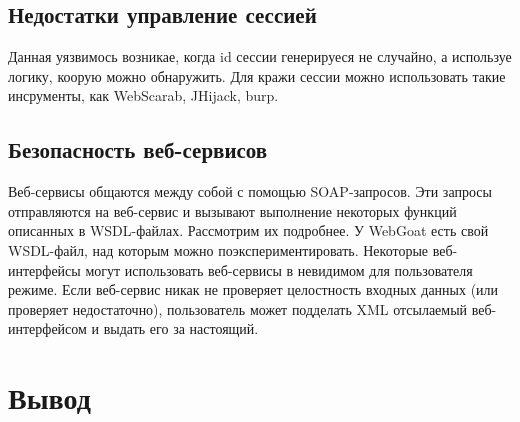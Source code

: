 \documentclass[11pt, a4paper]{article}		%
\begin{document}

\subsection{Недостатки управление сессией}

Данная уязвимось возникае, когда id сессии генерируеся не случайно, а используе логику, коорую можно обнаружить. Для кражи сессии можно использовать такие инсрументы, как WebScarab, JHijack, burp.



\subsection{Безопасность веб-сервисов}

Веб-сервисы общаются между собой с помощью SOAP-запросов. Эти запросы отправляются на веб-сервис и вызывают выполнение некоторых функций описанных в WSDL-файлах. Рассмотрим их подробнее. У WebGoat есть свой WSDL-файл, над которым можно поэкспериментировать. Некоторые веб-интерфейсы могут использовать веб-сервисы в невидимом для пользователя режиме. Если веб-сервис никак не проверяет целостность входных данных (или проверяет недостаточно), пользователь может подделать XML отсылаемый веб-интерфейсом и выдать его за настоящий.



\section{Вывод}
\end{document}
